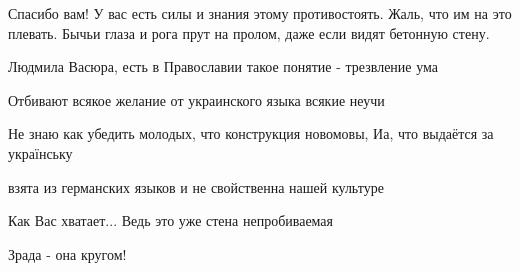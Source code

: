 \fi

\begin{itemize}

Спасибо вам! У вас есть силы и знания этому противостоять. Жаль, что им на это
плевать. Бычьи глаза и рога прут на пролом, даже если видят бетонную стену.


Людмила Васюра, есть в Православии такое понятие - трезвление ума


Отбивают всякое желание от украинского языка всякие неучи


Не знаю как убедить молодых, что конструкция новомовы, Иа, что выдаётся за
українську


взята из германских языков и не свойственна нашей культуре


Как Вас хватает... Ведь это уже стена непробиваемая


Зрада - она кругом!
\end{itemize}
